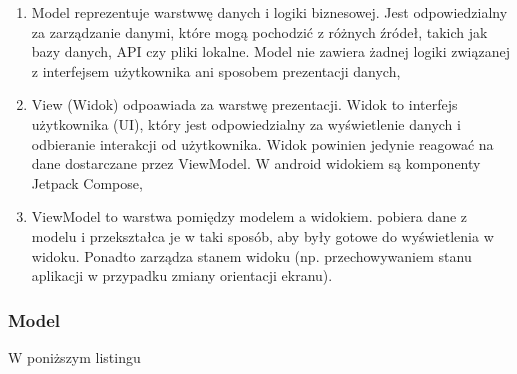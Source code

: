 \documentclass[12pt,twoside]{article}
\begin{document}
\begin{enumerate}[label=\alph*), leftmargin=1.25cm]
	\item Model reprezentuje warstwwę danych i logiki biznesowej. Jest odpowiedzialny za zarządzanie danymi,
	które mogą pochodzić z różnych źródeł, takich jak bazy danych, API czy pliki lokalne. Model nie zawiera
	żadnej logiki związanej z interfejsem użytkownika ani sposobem prezentacji danych,
	\item View (Widok) odpoawiada za warstwę prezentacji. Widok to interfejs użytkownika (UI), który jest
	odpowiedzialny za wyświetlenie danych i odbieranie interakcji od użytkownika. Widok powinien jedynie
	reagować na dane dostarczane przez ViewModel. W android widokiem są komponenty Jetpack Compose,
	\item ViewModel to warstwa pomiędzy modelem a widokiem. pobiera dane z modelu i przekształca je
	w taki sposób, aby były gotowe do wyświetlenia w widoku. Ponadto zarządza stanem widoku (np. przechowywaniem
	stanu aplikacji w przypadku zmiany orientacji ekranu).
\end{enumerate}

\subsubsection{Model}

W poniższym listingu 

\clearpage


\begin{thebibliography}{4}
\end{thebibliography}

\clearpage

\makesummary
\end{document}
